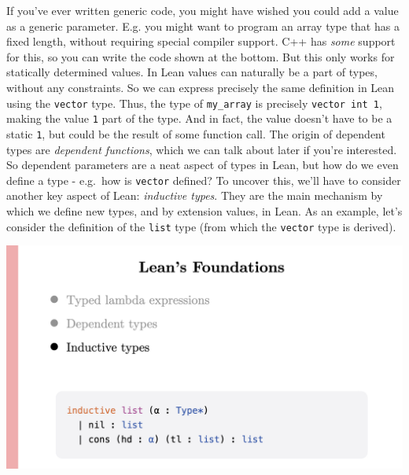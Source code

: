 \documentclass{article}
\begin{document}
If you've ever written generic code, you might have wished you could add
a value as a generic parameter. E.g. you might want to program an array
type that has a fixed length, without requiring special compiler
support. C++ has \emph{some} support for this, so you can write the code
shown at the bottom. But this only works for statically determined
values. In Lean values can naturally be a part of types, without any
constraints. So we can express precisely the same definition in Lean
using the \lstinline{vector} type. Thus, the type of \lstinline{my_array} is
precisely \lstinline{vector int 1}, making the value \lstinline{1} part of
the type. And in fact, the value doesn't have to be a static \lstinline{1},
but could be the result of some function call. The origin of dependent
types are \emph{dependent functions}, which we can talk about later if
you're interested. So dependent parameters are a neat aspect of types in
Lean, but how do we even define a type - e.g.~how is \lstinline{vector}
defined? To uncover this, we'll have to consider another key aspect of
Lean: \emph{inductive types}. They are the main mechanism by which we
define new types, and by extension values, in Lean. As an example, let's
consider the definition of the \lstinline{list} type (from which the
\lstinline{vector} type is derived).

\begin{center}
  \includegraphics[width=\columnwidth]{Slides/Slide 6.jpeg}
\end{center}
\end{document}
